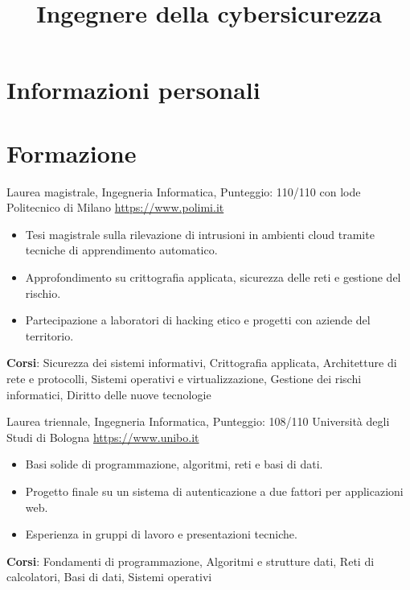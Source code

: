 \documentclass[a4paper, serif, 10pt]{moderncv}
\title{Ingegnere della cybersicurezza}
\begin{document}
\maketitle

\section{Informazioni personali}

\section{Formazione}

        {Laurea magistrale, Ingegneria Informatica, Punteggio: 110/110 con lode}
        {Politecnico di Milano}
        {\url{https://www.polimi.it}}
        {}
        {\begin{itemize}
\item Tesi magistrale sulla rilevazione di intrusioni in ambienti cloud tramite tecniche di apprendimento automatico.
\item Approfondimento su crittografia applicata, sicurezza delle reti e gestione del rischio.
\item Partecipazione a laboratori di hacking etico e progetti con aziende del territorio.
\end{itemize}
\textbf{Corsi}: Sicurezza dei sistemi informativi, Crittografia applicata, Architetture di rete e protocolli, Sistemi operativi e virtualizzazione, Gestione dei rischi informatici, Diritto delle nuove tecnologie}

        {Laurea triennale, Ingegneria Informatica, Punteggio: 108/110}
        {Università degli Studi di Bologna}
        {\url{https://www.unibo.it}}
        {}
        {\begin{itemize}
\item Basi solide di programmazione, algoritmi, reti e basi di dati.
\item Progetto finale su un sistema di autenticazione a due fattori per applicazioni web.
\item Esperienza in gruppi di lavoro e presentazioni tecniche.
\end{itemize}
\textbf{Corsi}: Fondamenti di programmazione, Algoritmi e strutture dati, Reti di calcolatori, Basi di dati, Sistemi operativi}
\end{document}
